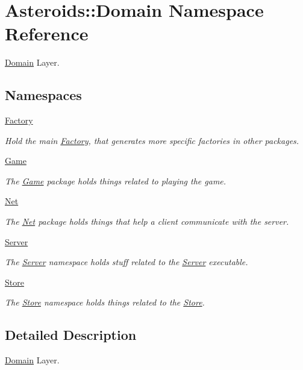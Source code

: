 \hypertarget{namespaceAsteroids_1_1Domain}{}\section{Asteroids\+:\+:Domain Namespace Reference}
\label{namespaceAsteroids_1_1Domain}


\hyperlink{namespaceAsteroids_1_1Domain}{Domain} Layer.  


\subsection*{Namespaces}
\begin{DoxyCompactItemize}
\item 
 \hyperlink{namespaceAsteroids_1_1Domain_1_1Factory}{Factory}
\begin{DoxyCompactList}\small\item\em Hold the main \hyperlink{classAsteroids_1_1Domain_1_1Factory_1_1Factory}{Factory}, that generates more specific factories in other packages. \end{DoxyCompactList}\item 
 \hyperlink{namespaceAsteroids_1_1Domain_1_1Game}{Game}
\begin{DoxyCompactList}\small\item\em The \hyperlink{classAsteroids_1_1Domain_1_1Game_1_1Game}{Game} package holds things related to playing the game. \end{DoxyCompactList}\item 
 \hyperlink{namespaceAsteroids_1_1Domain_1_1Net}{Net}
\begin{DoxyCompactList}\small\item\em The \hyperlink{namespaceAsteroids_1_1Domain_1_1Net}{Net} package holds things that help a client communicate with the server. \end{DoxyCompactList}\item 
 \hyperlink{namespaceAsteroids_1_1Domain_1_1Server}{Server}
\begin{DoxyCompactList}\small\item\em The \hyperlink{namespaceAsteroids_1_1Domain_1_1Server}{Server} namespace holds stuff related to the \hyperlink{namespaceAsteroids_1_1Domain_1_1Server}{Server} executable. \end{DoxyCompactList}\item 
 \hyperlink{namespaceAsteroids_1_1Domain_1_1Store}{Store}
\begin{DoxyCompactList}\small\item\em The \hyperlink{classAsteroids_1_1Domain_1_1Store_1_1Store}{Store} namespace holds things related to the \hyperlink{classAsteroids_1_1Domain_1_1Store_1_1Store}{Store}. \end{DoxyCompactList}\end{DoxyCompactItemize}


\subsection{Detailed Description}
\hyperlink{namespaceAsteroids_1_1Domain}{Domain} Layer. 